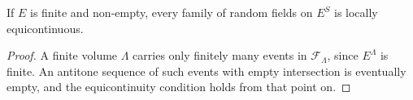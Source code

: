 \begin{lemma}
    \label{lem:sym-equicontinuous-finite}
    \leanok

    If $E$ is finite and non-empty, every family of random fields on $E^S$ is locally
    equicontinuous.
\end{lemma}
\begin{proof}
    \leanok

    A finite volume $\Lambda$ carries only finitely many events in $\mathcal{F}_\Lambda$, since
    $E^\Lambda$ is finite. An antitone sequence of such events with empty intersection is
    eventually empty, and the equicontinuity condition holds from that point on.
\end{proof}

